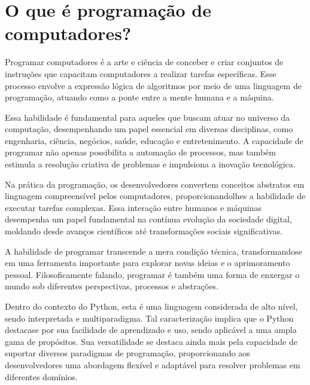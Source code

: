 \documentclass[letterpaper,10pt,english]{jupyterBook}
\begin{document}
\section{O que é programação de computadores?}
\label{\detokenize{chapters/ch1/ch1:o-que-e-programacao-de-computadores}}
\sphinxAtStartPar
Programar computadores é a arte e ciência de conceber e criar conjuntos de instruções que capacitam computadores a realizar tarefas específicas. Esse processo envolve a expressão lógica de algoritmos por meio de uma linguagem de programação, atuando como a ponte entre a mente humana e a máquina.

\sphinxAtStartPar
Essa habilidade é fundamental para aqueles que buscam atuar no universo da computação, desempenhando um papel essencial em diversas disciplinas, como engenharia, ciência, negócios, saúde, educação e entretenimento. A capacidade de programar não apenas possibilita a automação de processos, mas também estimula a resolução criativa de problemas e impulsiona a inovação tecnológica.

\sphinxAtStartPar
Na prática da programação, os desenvolvedores convertem conceitos abstratos em linguagem compreensível pelos computadores, proporcionando\sphinxhyphen{}lhes a habilidade de executar tarefas complexas. Essa interação entre humanos e máquinas desempenha um papel fundamental na contínua evolução da sociedade digital, moldando desde avanços científicos até transformações sociais significativas.

\sphinxAtStartPar
A habilidade de programar transcende a mera condição técnica, transformando\sphinxhyphen{}se em uma ferramenta importante para explorar novas ideias e o aprimoramento pessoal. Filosoficamente falando, programar é também uma forma de enxergar o mundo sob diferentes perspectivas, processos e abstrações.

\sphinxAtStartPar
Dentro do contexto do Python, esta é uma linguagem considerada de alto nível, sendo interpretada e multiparadigma. Tal caracterização implica que o Python destaca\sphinxhyphen{}se por sua facilidade de aprendizado e uso, sendo aplicável a uma ampla gama de propósitos. Sua versatilidade se destaca ainda mais pela capacidade de suportar diversos paradigmas de programação, proporcionando aos desenvolvedores uma abordagem flexível e adaptável para resolver problemas em diferentes domínios.
\end{document}
